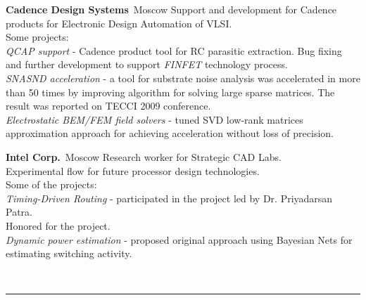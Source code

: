 \documentclass[11pt,a4paper,roman]{moderncv}
\newcommand{\strong}[1]{{\color{UniBlue}\textbf{#1}}}
\newcommand{\HRule}{{\color{UniBlue}\rule{\linewidth}{0.3mm}}}
\renewcommand{\section}[1]{\vspace{1cm}{\Large\strong{#1}} \\[0.005mm] \HRule \\ \vspace{-0.3cm}}
\begin{document}
    {{\bfseries{Cadence Design Systems}}\ }{Moscow}{}{
  Support and development for Cadence products for Electronic Design Automation of VLSI. \\
  Some projects: \\
  \emph{QCAP support} - Cadence product tool for RC parasitic extraction. Bug fixing and further development to support {\em{FINFET}} technology process. \\
  \emph{SNASND acceleration} - a tool for substrate noise analysis was accelerated in more than 50 times by improving algorithm for solving large sparse matrices. The result was reported on TECCI 2009 conference. \\
  \emph{Electrostatic BEM/FEM field solvers} - tuned SVD low-rank matrices approximation approach for achieving acceleration without loss of precision. \\
}

    {{\bfseries{Intel Corp.}}\ }{Moscow}{}{
    Research worker for Strategic CAD Labs. \\
    Experimental flow for future processor design technologies. \\
    Some of the projects: \\
    \emph{Timing-Driven Routing} - participated in the project led by Dr. Priyadarsan Patra. \\
    Honored for the project. \\
    \emph{Dynamic power estimation} - proposed original approach using Bayesian Nets for estimating switching activity. \\
}

\medskip
\section{\strong{Skills}}


\end{document}
